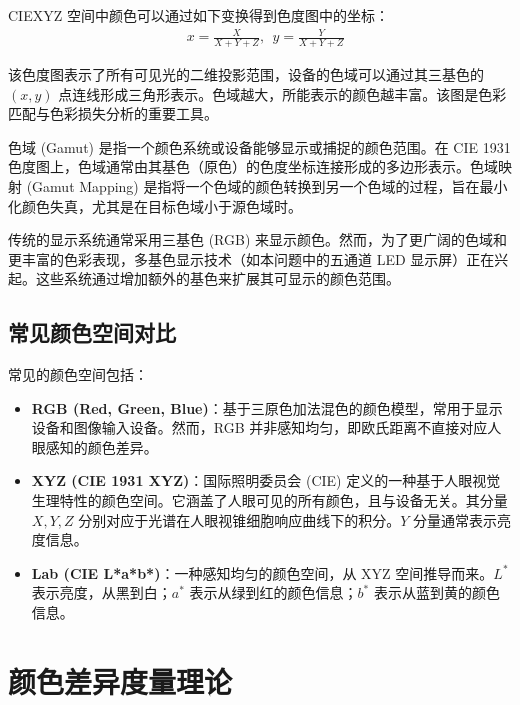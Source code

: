 CIEXYZ 空间中颜色可以通过如下变换得到色度图中的坐标：
\begin{equation}
\begin{aligned}
  &x=\frac{X}{X+Y+Z},\ \ y=\frac{Y}{X+Y+Z}
\end{aligned}
\end{equation}

该色度图表示了所有可见光的二维投影范围，设备的色域可以通过其三基色的 $(x,y)$ 点连线形成三角形表示。色域越大，所能表示的颜色越丰富。该图是色彩匹配与色彩损失分析的重要工具。

色域 (Gamut) 是指一个颜色系统或设备能够显示或捕捉的颜色范围。在 CIE 1931 色度图上，色域通常由其基色（原色）的色度坐标连接形成的多边形表示。色域映射 (Gamut Mapping) 是指将一个色域的颜色转换到另一个色域的过程，旨在最小化颜色失真，尤其是在目标色域小于源色域时。

传统的显示系统通常采用三基色 (RGB) 来显示颜色。然而，为了更广阔的色域和更丰富的色彩表现，多基色显示技术（如本问题中的五通道 LED 显示屏）正在兴起。这些系统通过增加额外的基色来扩展其可显示的颜色范围。

\subsection[\hspace{-2pt}常见颜色空间对比]{{\heiti{} \hspace{-8pt}常见颜色空间对比}}\label{subsection2: 常见颜色空间对比}

常见的颜色空间包括：

\begin{itemize}
    \item \textbf{RGB (Red, Green, Blue)}：基于三原色加法混色的颜色模型，常用于显示设备和图像输入设备。然而，RGB 并非感知均匀，即欧氏距离不直接对应人眼感知的颜色差异。
    \item \textbf{XYZ (CIE 1931 XYZ)}：国际照明委员会 (CIE) 定义的一种基于人眼视觉生理特性的颜色空间。它涵盖了人眼可见的所有颜色，且与设备无关。其分量 $X, Y, Z$ 分别对应于光谱在人眼视锥细胞响应曲线下的积分。$Y$ 分量通常表示亮度信息。
    \item \textbf{Lab (CIE L*a*b*)}：一种感知均匀的颜色空间，从 XYZ 空间推导而来。$L^*$ 表示亮度，从黑到白；$a^*$ 表示从绿到红的颜色信息；$b^*$ 表示从蓝到黄的颜色信息。
\end{itemize}

\section[\hspace{-2pt}颜色差异度量理论]{{\heiti{} \hspace{-8pt}颜色差异度量理论}}\label{section2: 颜色差异度量理论}

